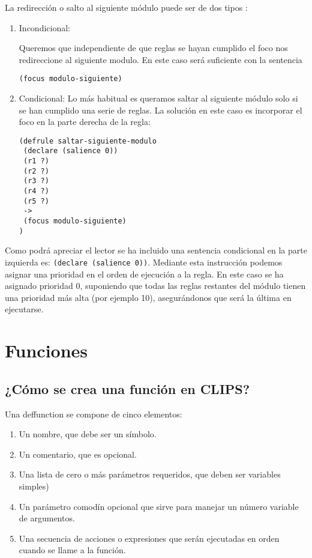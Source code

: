 \documentclass[11pt,svgnames]{scrbook}
\begin{document}
La redirección o salto al siguiente módulo puede ser de dos tipos :
\begin{enumerate}
 \item Incondicional: 

Queremos que independiente de que reglas se hayan cumplido el foco nos
redireccione al siguiente modulo. En este caso será suficiente con la sentencia

\texttt{(focus modulo-siguiente)}

\item Condicional:
Lo más habitual es queramos saltar al siguiente módulo solo si se han cumplido
una serie de reglas. La solución en este caso es incorporar el foco en la parte
derecha de la regla:

\begin{verbatim}
(defrule saltar-siguiente-modulo
 (declare (salience 0))
 (r1 ?)
 (r2 ?)
 (r3 ?)
 (r4 ?)
 (r5 ?)
 ->
 (focus modulo-siguiente)
)
\end{verbatim} \end{enumerate}

Como podrá apreciar el lector se ha incluido una  sentencia condicional en la
parte izquierda es: \texttt{(declare (salience 0))}. Mediante esta instrucción
podemos asignar una prioridad en el orden de ejecución a la regla. 
  En este caso se
ha asignado prioridad 0, suponiendo que todas las reglas restantes del módulo
tienen una prioridad más alta (por ejemplo 10), asegurándonos que será la última
en ejecutarse.


\section{Funciones}



\subsection{¿Cómo se crea una función en CLIPS?}

Una deffunction se compone de cinco elementos:
\begin{enumerate}
 \item Un nombre, que debe ser un símbolo.
\item Un comentario, que es opcional.
\item Una lista de cero o más parámetros requeridos, que deben ser variables
simples)
\item Un parámetro comodín opcional que sirve para manejar un número variable
de
argumentos.
\item Una secuencia de acciones o expresiones que serán ejecutadas en orden
cuando
se llame a la función.
\end{enumerate}
\end{document}
